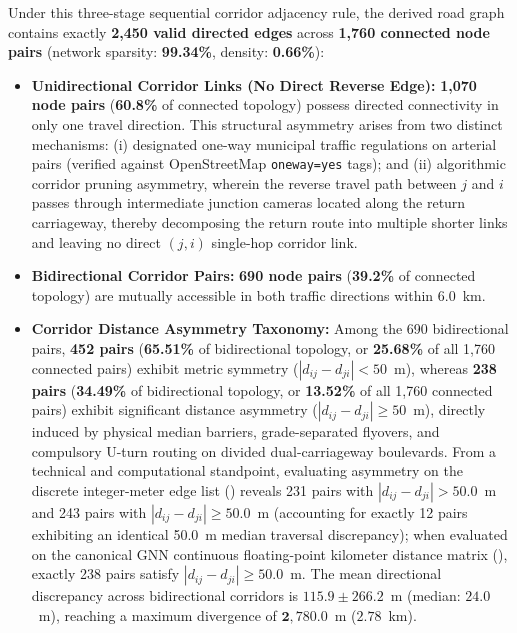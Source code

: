 \documentclass[preprint,12pt]{elsarticle}
\begin{document}
Under this three-stage sequential corridor adjacency rule, the derived road graph contains exactly \textbf{2,450 valid directed edges} across \textbf{1,760 connected node pairs} (network sparsity: \textbf{99.34\%}, density: \textbf{0.66\%}):
\begin{itemize}
    \item \textbf{Unidirectional Corridor Links (No Direct Reverse Edge):} \textbf{1,070 node pairs} (\textbf{60.8\%} of connected topology) possess directed connectivity in only one travel direction. This structural asymmetry arises from two distinct mechanisms: (i) designated one-way municipal traffic regulations on arterial pairs (verified against OpenStreetMap \texttt{oneway=yes} tags); and (ii) algorithmic corridor pruning asymmetry, wherein the reverse travel path between $j$ and $i$ passes through intermediate junction cameras located along the return carriageway, thereby decomposing the return route into multiple shorter links and leaving no direct $(j, i)$ single-hop corridor link.
    \item \textbf{Bidirectional Corridor Pairs:} \textbf{690 node pairs} (\textbf{39.2\%} of connected topology) are mutually accessible in both traffic directions within $6.0$~km.
    \item \textbf{Corridor Distance Asymmetry Taxonomy:} Among the 690 bidirectional pairs, \textbf{452 pairs} (\textbf{65.51\%} of bidirectional topology, or \textbf{25.68\%} of all 1,760 connected pairs) exhibit metric symmetry ($|d_{ij} - d_{ji}| < 50$~m), whereas \textbf{238 pairs} (\textbf{34.49\%} of bidirectional topology, or \textbf{13.52\%} of all 1,760 connected pairs) exhibit significant distance asymmetry ($|d_{ij} - d_{ji}| \ge 50$~m), directly induced by physical median barriers, grade-separated flyovers, and compulsory U-turn routing on divided dual-carriageway boulevards. From a technical and computational standpoint, evaluating asymmetry on the discrete integer-meter edge list () reveals 231 pairs with $|d_{ij} - d_{ji}| > 50.0$~m and 243 pairs with $|d_{ij} - d_{ji}| \ge 50.0$~m (accounting for exactly 12 pairs exhibiting an identical 50.0~m median traversal discrepancy); when evaluated on the canonical GNN continuous floating-point kilometer distance matrix (), exactly 238 pairs satisfy $|d_{ij} - d_{ji}| \ge 50.0$~m. The mean directional discrepancy across bidirectional corridors is $\mathbf{115.9 \pm 266.2}$~m (median: $24.0$~m), reaching a maximum divergence of $\mathbf{2,780.0}$~m ($2.78$~km).

\end{itemize}
\end{document}
